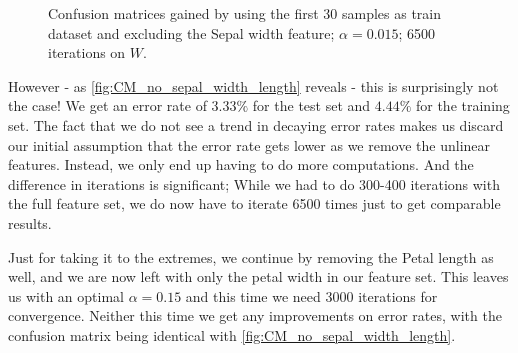 \documentclass{article}
\begin{document}
\begin{figure}
    \centering
    \qquad
    \caption{Confusion matrices gained by using the first 30 samples as train dataset%
    and excluding the Sepal width feature;%
    $\alpha = 0.015$; 6500 iterations on $W$.}\label{fig:CM_no_sepal_width_length}
\end{figure}

However - as \autoref{fig:CM_no_sepal_width_length} reveals - this is surprisingly not the case!
We get an error rate of $3.33\%$ for the test set and $4.44\%$ for the training set.
The fact that we do not see a trend in decaying error rates makes us discard our initial assumption
that the error rate gets lower as we remove the unlinear features. Instead, we only end up having
to do more computations. And the difference in iterations is significant; While we had to do
300-400 iterations with the full feature set, we do now have to iterate 6500 times just to get
comparable results.

Just for taking it to the extremes, we continue by removing the Petal length as well, and we are
now left with only the petal width in our feature set. This leaves us with an optimal $\alpha = 0.15$
and this time we need $3000$ iterations for convergence. Neither this time we get any improvements on
error rates, with the confusion matrix being identical with \autoref{fig:CM_no_sepal_width_length}.
\end{document}
